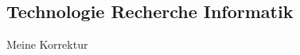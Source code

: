 \documentclass[../main.tex]{subfiles}
\begin{document}
\subsection{Technologie Recherche Informatik}
Meine Korrektur
\end{document}
